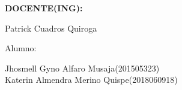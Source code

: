 \documentclass[12pt,letterpaper]{article}
\begin{document}
\begin{titlepage}
\begin{center}
\vspace*{0.3in}
\begin{Large}
\textbf{DOCENTE(ING):} \\
\end{Large}

\vspace*{0.1in}
\begin{large}
 Patrick Cuadros Quiroga\\
\end{large}

\vspace*{0.2in}
\vspace*{0.1in}
\begin{large}
Alumno: \\
\begin{flushleft}
Jhosmell Gyno Alfaro Musaja\hfill	(201505323) \\
Katerin Almendra Merino Quispe\hfill 	(2018060918) \\
\end{flushleft}
\end{large}
\end{center}

\end{titlepage}


\tableofcontents %
\thispagestyle{empty} %
\newpage
\setcounter{page}{1} %




\end{document}

